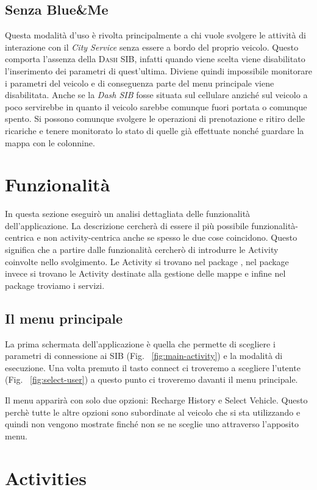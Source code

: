 \subsection{Senza Blue\&{}Me}

Questa modalità d'uso è rivolta principalmente a chi vuole svolgere le attività di interazione con il \emph{City Service} senza essere a bordo del proprio veicolo. Questo comporta l'assenza della \textsc{Dash SIB}, infatti quando viene scelta viene disabilitato l'inserimento dei parametri di quest'ultima. Diviene quindi impossibile monitorare i parametri del veicolo e di conseguenza parte del menu principale viene disabilitata. Anche se la \emph{Dash SIB} fosse situata sul cellulare anziché sul veicolo a poco servirebbe in quanto il veicolo sarebbe comunque fuori portata o comunque spento. Si possono comunque svolgere le operazioni di prenotazione e ritiro delle ricariche e tenere monitorato lo stato di quelle già effettuate nonché guardare la mappa con le colonnine.


\section{Funzionalità}

In questa sezione eseguirò un analisi dettagliata delle funzionalità dell'applicazione. La descrizione cercherà di essere il più possibile funzionalità-centrica e non activity-centrica anche se spesso le due cose coincidono. Questo significa che a partire dalle funzionalità cercherò di introdurre le Activity coinvolte nello svolgimento.
Le Activity si trovano nel package , nel package  invece si trovano le Activity destinate alla gestione delle mappe e infine nel package  troviamo i servizi. 

\subsection{Il menu principale}

La prima schermata dell'applicazione è quella che permette di scegliere i parametri di connessione ai SIB (Fig. ~\ref{fig:main-activity})  e la modalità di esecuzione. Una volta premuto il tasto connect ci troveremo a scegliere l'utente (Fig. ~\ref{fig:select-user}) a questo punto ci troveremo davanti il menu principale.

Il menu apparirà con solo due opzioni: Recharge History e Select Vehicle. Questo perchè tutte le altre opzioni sono subordinate al veicolo che si sta utilizzando e quindi non vengono mostrate finché non se ne sceglie uno attraverso l'apposito menu.
 
\section{Activities}
